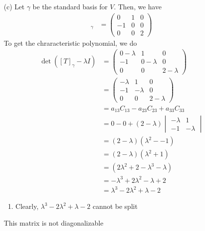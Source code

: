 \documentclass[13pt]{article}
\begin{document}
\begin{enumerate}[label=(\alph*),leftmargin=*]
\item [(c)] Let $\gamma$ be the standard basis for $V$. Then, we have
  \begin{align*}
    [T]_\gamma &=
                 \begin{pmatrix}
                   0 & 1 & 0 \\
                   -1 & 0 & 0 \\
                   0 & 0 & 2
                 \end{pmatrix}
  \end{align*}
  To get the chraracteristic polynomial, we do
  \begin{align*}
    \det([T]_\gamma - \lambda I) &=
                                   \begin{pmatrix}
                                     0 - \lambda & 1 & 0 \\
                                     -1 & 0 - \lambda & 0 \\
                                     0 & 0 & 2 - \lambda
                                   \end{pmatrix} \\
                                 &= \begin{pmatrix}
                                     -\lambda & 1 & 0 \\
                                     -1 & -\lambda & 0 \\
                                     0 & 0 & 2 - \lambda
                                    \end{pmatrix} \\
                                 &= a_{13}C_{13} - a_{23}C_{23} + a_{33}C_{33} \\
                                 &= 0 - 0 + (2 - \lambda)
                                   \begin{vmatrix}
                                     -\lambda & 1 \\
                                     -1 & -\lambda
                                   \end{vmatrix} \\
                                 &= (2 - \lambda)(\lambda^2 - -1) \\
                                 &= (2 - \lambda)(\lambda^2 + 1) \\
                                 &= (2\lambda^2 + 2 -\lambda^3 - \lambda) \\
                                 &= -\lambda^3 + 2\lambda^2 - \lambda + 2 \\
                                 &= \lambda^3 - 2\lambda^2 + \lambda - 2
  \end{align*}
  \begin{enumerate}
  \item Clearly, $\lambda^3 - 2\lambda^2 + \lambda - 2$ cannot be split  
  \end{enumerate}
  This matrix is not diagonalizable
\end{enumerate}
\end{document}

